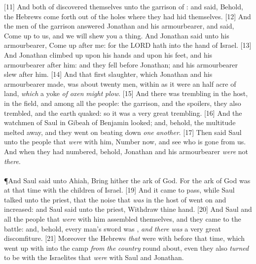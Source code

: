 [11] \textcolor[cmyk]{0.99998,1,0,0}{And both of  discovered themselves unto the garrison of  : and   said, Behold, the Hebrews come forth out of the holes where they had hid themselves.}
[12] \textcolor[cmyk]{0.99998,1,0,0}{And the men of the garrison answered Jonathan and his armourbearer, and said, Come up to us, and we will shew you a thing. And Jonathan said unto his armourbearer, Come up after me: for the LORD hath   into the hand of Israel.}
[13] \textcolor[cmyk]{0.99998,1,0,0}{And Jonathan climbed up upon his hands and upon his feet, and his armourbearer after him: and they fell before Jonathan; and his armourbearer slew after him.}
[14] \textcolor[cmyk]{0.99998,1,0,0}{And that first slaughter, which Jonathan and his armourbearer made, was about twenty men, within as it were an half acre of land, \emph{which} a yoke \emph{of} \emph{oxen} \emph{might} \emph{plow}.}
[15] \textcolor[cmyk]{0.99998,1,0,0}{And there was trembling in the host, in the field, and among all the people: the garrison, and the spoilers, they also trembled, and the earth quaked: so it was a very great trembling.}
[16] \textcolor[cmyk]{0.99998,1,0,0}{And the watchmen of Saul in Gibeah of Benjamin looked; and, behold, the multitude melted away, and they went on beating down \emph{one} \emph{another}.}
[17] \textcolor[cmyk]{0.99998,1,0,0}{Then said Saul unto the people that \emph{were} with him, Number now, and see who is gone from us. And when they had numbered, behold, Jonathan and his armourbearer \emph{were} not \emph{there}.}\\
\\
\P \textcolor[cmyk]{0.99998,1,0,0}{And Saul said unto Ahiah, Bring hither the ark of God. For the ark of God was at that time with the children of Israel.}
[19] \textcolor[cmyk]{0.99998,1,0,0}{And it came to pass, while Saul talked unto the priest, that the noise that \emph{was} in the host of   went on and increased: and Saul said unto the priest, Withdraw thine hand.}
[20] \textcolor[cmyk]{0.99998,1,0,0}{And Saul and all the people that \emph{were} with him assembled themselves, and they came to the battle: and, behold, every man's sword was , \emph{and} \emph{there} \emph{was} a very great discomfiture.}
[21] \textcolor[cmyk]{0.99998,1,0,0}{Moreover the Hebrews \emph{that} were with   before that time, which went up with  into the camp \emph{from} \emph{the} \emph{country} round about, even they also \emph{turned} to be with the Israelites that \emph{were} with Saul and Jonathan.}
